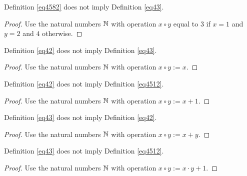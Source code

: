 \begin{theorem}\label{4582_not_imply_43}\leanok{} Definition \ref{eq4582} does not imply Definition \ref{eq43}.
\end{theorem}

\begin{proof}\leanok Use the natural numbers $\mathbb{N}$ with operation $x \circ y$ equal to $3$ if $x=1$ and $y=2$ and $4$ otherwise.
\end{proof}

\begin{theorem}\label{42_not_imply_43}\leanok{} Definition \ref{eq42} does not imply Definition \ref{eq43}.
\end{theorem}

\begin{proof}\leanok Use the natural numbers $\mathbb{N}$ with operation $x \circ y := x$.
\end{proof}

\begin{theorem}\label{42_not_imply_4512}\leanok{} Definition \ref{eq42} does not imply Definition \ref{eq4512}.
\end{theorem}

\begin{proof}\leanok Use the natural numbers $\mathbb{N}$ with operation $x \circ y := x+1$.
\end{proof}

\begin{theorem}\label{43_not_imply_42}\leanok{} Definition \ref{eq43} does not imply Definition \ref{eq42}.
\end{theorem}

\begin{proof}\leanok Use the natural numbers $\mathbb{N}$ with operation $x \circ y := x+y$.
\end{proof}

\begin{theorem}\label{43_not_imply_4512}\leanok{} Definition \ref{eq43} does not imply Definition \ref{eq4512}.
\end{theorem}

\begin{proof}\leanok Use the natural numbers $\mathbb{N}$ with operation $x \circ y := x \cdot y + 1$.
\end{proof}


